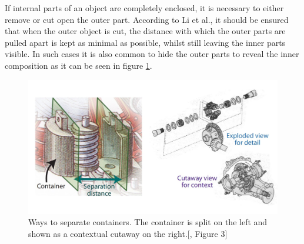 If internal parts of an object are completely enclosed, it is necessary to either remove or cut open the outer part. According to Li et al., it should be ensured that when the outer object is cut, the distance with which the outer parts are pulled apart is kept as minimal as possible, whilst still leaving the inner parts visible.\cite{Wilmot_Li_2008}
In such cases it is also common to hide the outer parts to reveal the inner composition as it can be seen in figure \ref{fig:Li_2008_containerSplit}.
\begin{figure}[h]
	\centering
	\includegraphics[width=.8\linewidth]{fig/Images/Li_2008_fig3}
	\caption[]{Ways to separate containers. The container is split on the left and shown as a contextual cutaway on the right.[\cite{Wilmot_Li_2008}, Figure 3]}
	\label{fig:Li_2008_containerSplit}
\end{figure}



